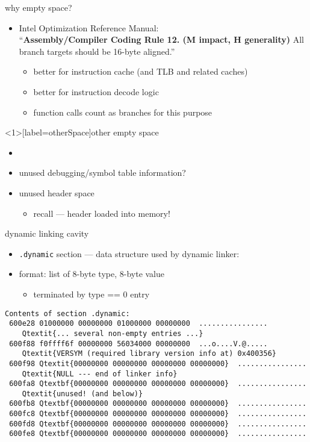 \begin{frame}{why empty space?}
\begin{itemize}
\item Intel Optimization Reference Manual: \\
``\textbf{Assembly/Compiler Coding Rule 12. (M impact, H generality)} All branch targets should be 16-byte aligned.''
\begin{itemize}
    \item better for instruction cache {\small (and TLB and related caches)}
    \item better for instruction decode logic
    \item function calls count as branches for this purpose
\end{itemize}
\end{itemize}
\end{frame}

\begin{frame}<1>[label=otherSpace]{other empty space}
\begin{itemize}
\item {}
\item unused debugging/symbol table information?
\item unused header space 
    \begin{itemize}
    \item recall --- header loaded into memory!
    \end{itemize}
\end{itemize}
\end{frame}


\begin{frame}[label=spaceDyn,fragile]{dynamic linking cavity}
\begin{itemize}
\item {\tt .dynamic} section --- data structure used by dynamic linker:
\item format: list of 8-byte type, 8-byte value
    \begin{itemize}
    \item terminated by type == 0 entry
    \end{itemize}
\end{itemize}
\begin{Verbatim}[fontsize=\fontsize{9}{10}\selectfont,commandchars=Q\{\}]
Contents of section .dynamic:
 600e28 01000000 00000000 01000000 00000000  ................
    Qtextit{... several non-empty entries ...}
 600f88 f0ffff6f 00000000 56034000 00000000  ...o....V.@.....
    Qtextit{VERSYM (required library version info at) 0x400356}
 600f98 Qtextit{00000000 00000000 00000000 00000000}  ................
    Qtextit{NULL --- end of linker info}
 600fa8 Qtextbf{00000000 00000000 00000000 00000000}  ................
    Qtextit{unused! (and below)}
 600fb8 Qtextbf{00000000 00000000 00000000 00000000}  ................
 600fc8 Qtextbf{00000000 00000000 00000000 00000000}  ................
 600fd8 Qtextbf{00000000 00000000 00000000 00000000}  ................
 600fe8 Qtextbf{00000000 00000000 00000000 00000000}  ................
\end{Verbatim}
\end{frame}

